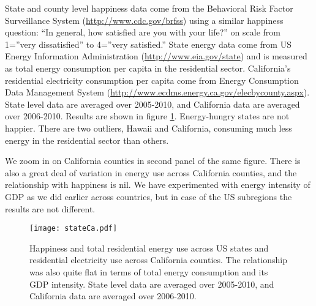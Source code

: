 \documentclass[10pt, letterpaper]{article}
\begin{document}
\begin{spacing}{1.0}
State and county level happiness data come from the Behavioral Risk Factor
Surveillance System (\url{http://www.cdc.gov/brfss}) using a similar happiness question: ``In general,
how satisfied are you with your life?'' on scale 
from 1=''very dissatisfied'' to 4=''very satisfied.'' State energy  data come from
US Energy Information Administration (\url{http://www.eia.gov/state})  and is measured as total energy
consumption per capita in the residential sector.  
California's  residential electricity consumption per capita come from 
Energy Consumption Data Management System
(\url{http://www.ecdms.energy.ca.gov/elecbycounty.aspx}). State level data are
averaged over 2005-2010, and California data are
averaged over 2006-2010.
Results are shown in
figure \ref{stateCaPAP}. Energy-hungry states  are not happier. %
 There are two outliers, Hawaii and California, consuming much less energy in
the residential sector than others. 

We zoom in on California counties in
second panel of the same figure. There is also a great deal of variation in energy
use across California counties, and the relationship with happiness is nil. 
We have  experimented with energy intensity of
GDP as we did earlier across countries, but in case of the US subregions the results are
not different. %

\begin{figure}[H]
 \texttt{[image: stateCa.pdf]}\centering
\caption{Happiness and total residential energy use across US states and
  residential electricity use across   
  California counties.  %
 The relationship was also quite flat in terms of total energy consumption and
 its GDP intensity. State level data are averaged over 2005-2010, and California data are averaged over 2006-2010.
}\label{stateCaPAP}
 \end{figure} %


\end{spacing}
\end{document}
